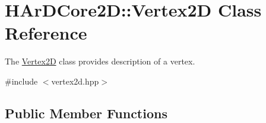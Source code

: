 \hypertarget{classHArDCore2D_1_1Vertex2D}{}\section{H\+Ar\+D\+Core2D\+:\+:Vertex2D Class Reference}
\label{classHArDCore2D_1_1Vertex2D}


The \hyperlink{classHArDCore2D_1_1Vertex2D}{Vertex2D} class provides description of a vertex.  




{\ttfamily \#include $<$vertex2d.\+hpp$>$}

\subsection*{Public Member Functions}

